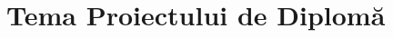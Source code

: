 \chapter*{Tema Proiectului de Diplomă}

\thispagestyle{front}
\pagestyle{front}




\newpage \
\newpage \
\newpage